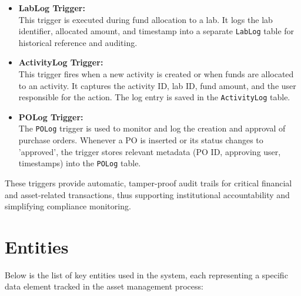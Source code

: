 \documentclass[11pt]{article}
\begin{document}
\begin{itemize}
  \item \textbf{LabLog Trigger:} \\
  This trigger is executed during fund allocation to a lab. It logs the lab identifier, allocated amount, and timestamp into a separate \texttt{LabLog} table for historical reference and auditing.

  \item \textbf{ActivityLog Trigger:} \\
  This trigger fires when a new activity is created or when funds are allocated to an activity. It captures the activity ID, lab ID, fund amount, and the user responsible for the action. The log entry is saved in the \texttt{ActivityLog} table.

  \item \textbf{POLog Trigger:} \\
  The \texttt{POLog} trigger is used to monitor and log the creation and approval of purchase orders. Whenever a PO is inserted or its status changes to 'approved', the trigger stores relevant metadata (PO ID, approving user, timestamps) into the \texttt{POLog} table.
\end{itemize}

These triggers provide automatic, tamper-proof audit trails for critical financial and asset-related transactions, thus supporting institutional accountability and simplifying compliance monitoring.

\section{Entities}
Below is the list of key entities used in the system, each representing a specific data element tracked in the asset management process:
\end{document}

